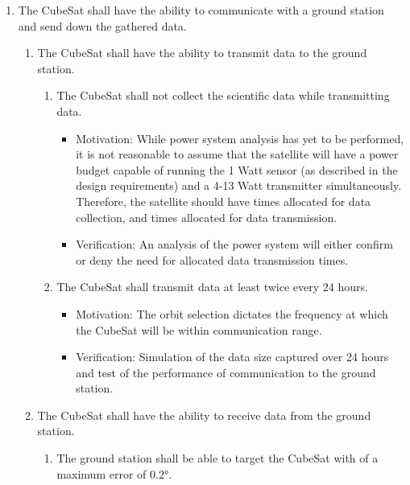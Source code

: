 \begin{enumerate}
\begin{enumerate}
\begin{enumerate}
\begin{itemize}
                    \item Verification: Environmental test chamber facility. 
                \end{itemize}
        \end{enumerate}
    \end{enumerate} %
    \item The CubeSat shall have the ability to communicate with a ground station and send down the gathered data.
    \begin{enumerate}
        \item The CubeSat shall have the ability to transmit data to the ground station.
        \begin{enumerate}
            \item The CubeSat shall not collect the scientific data while transmitting data.
                \begin{itemize}
                    \item Motivation: While power system analysis has yet to be performed, it is not reasonable to assume that the satellite will have a power budget capable of running the 1 Watt sensor (as described in the design requirements) and a 4-13 Watt\cite{shop} transmitter simultaneously. Therefore, the satellite should have times allocated for data collection, and times allocated for data transmission. 
                    \item Verification: An analysis of the power system will either confirm or deny the need for allocated data transmission times. 
                \end{itemize}
            \item The CubeSat shall transmit data at least twice every 24 hours. 
                \begin{itemize}
                    \item Motivation: The orbit selection dictates the frequency at which the CubeSat will be within communication range. 
                    \item Verification: Simulation of the data size captured over 24 hours and test of the performance of communication to the ground station.
                \end{itemize}
        \end{enumerate}
    \item The CubeSat shall have the ability to receive data from the ground station. 
        \begin{enumerate}
            \item The ground station shall be able to target the CubeSat with of a maximum error of 0.2°.

\end{enumerate}
\end{enumerate}
\end{enumerate}
